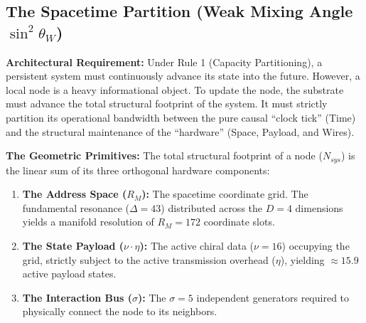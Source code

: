 



\subsection{The Spacetime Partition (Weak Mixing Angle \texorpdfstring{$\sin^2 \theta_W$}{sin2thetaW})}
\label{subsec:spacetime_partition}
\label{subsec:weak_mixing}

\textbf{Architectural Requirement:} Under Rule 1 (Capacity Partitioning), a persistent system must continuously advance its state into the future. However, a local node is a heavy informational object. To update the node, the substrate must advance the total structural footprint of the system. It must strictly partition its operational bandwidth between the pure causal ``clock tick'' (Time) and the structural maintenance of the ``hardware'' (Space, Payload, and Wires). 

\textbf{The Geometric Primitives:} The total structural footprint of a node ($N_{sys}$) is the linear sum of its three orthogonal hardware components:

\begin{enumerate}
    \item \textbf{The Address Space ($R_M$):} The spacetime coordinate grid. The fundamental resonance ($\Delta=43$) distributed across the $D=4$ dimensions yields a manifold resolution of $R_M = 172$ coordinate slots.
    \item \textbf{The State Payload ($\nu \cdot \eta$):} The active chiral data ($\nu=16$) occupying the grid, strictly subject to the active transmission overhead ($\eta$), yielding $\approx 15.9$ active payload states.
    \item \textbf{The Interaction Bus ($\sigma$):} The $\sigma = 5$ independent generators required to physically connect the node to its neighbors.
\end{enumerate}

